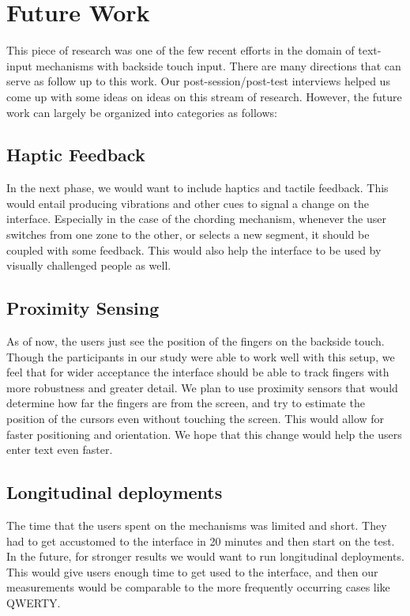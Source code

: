 \section{Future Work}

This piece of research was one of the few recent efforts in the domain
of text-input mechanisms with backside touch input. There are many
directions that can serve as follow up to this work. Our post-session/post-test interviews helped us come up with some ideas on  ideas on this stream of research. However, the
future work can largely be organized into categories as follows:

\subsection{Haptic Feedback}

In the next phase, we would want to include haptics and tactile
feedback. This would entail producing vibrations and other cues to
signal a change on the interface. Especially in the case of the
chording mechanism, whenever the user switches from one zone to the
other, or selects a new segment, it should be coupled with some
feedback. This would also help the interface to be used by visually
challenged people as well.

\subsection{Proximity Sensing}

As of now, the users just see the position of the fingers on the
backside touch. Though the participants in our study were able to work
well with this setup, we feel that for wider acceptance the interface
should be able to track fingers with more robustness and greater
detail. We plan to use proximity sensors that would determine how far
the fingers are from the screen, and try to estimate the position of
the cursors even without touching the screen. This would allow for
faster positioning and orientation. We hope that this change would
help the users enter text even faster.

\subsection{Longitudinal deployments} 

The time that the users spent on the mechanisms was limited and
short. They had to get accustomed to the interface in 20 minutes and
then start on the test. In the future, for stronger results we would
want to run longitudinal deployments. This would give users enough
time to get used to the interface, and then our measurements would be
comparable to the more frequently occurring cases like QWERTY.

